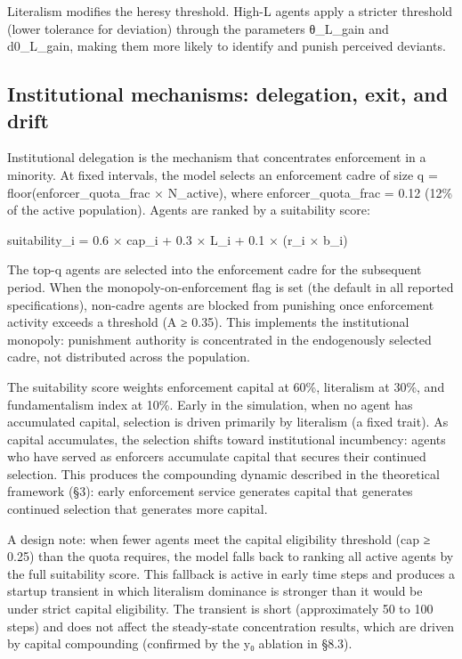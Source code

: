 \documentclass[12pt]{article}
\begin{document}
Literalism modifies the heresy threshold. High-L agents apply a stricter threshold (lower tolerance for deviation) through the parameters θ\_L\_gain and d0\_L\_gain, making them more likely to identify and punish perceived deviants.

%
\subsection{Institutional mechanisms: delegation, exit, and drift}

Institutional delegation is the mechanism that concentrates enforcement in a minority. At fixed intervals, the model selects an enforcement cadre of size q = floor(enforcer\_quota\_frac × N\_active), where enforcer\_quota\_frac = 0.12 (12\% of the active population). Agents are ranked by a suitability score:

suitability\_i = 0.6 × cap\_i + 0.3 × L\_i + 0.1 × (r\_i × b\_i)

The top-q agents are selected into the enforcement cadre for the subsequent period. When the monopoly-on-enforcement flag is set (the default in all reported specifications), non-cadre agents are blocked from punishing once enforcement activity exceeds a threshold (A ≥ 0.35). This implements the institutional monopoly: punishment authority is concentrated in the endogenously selected cadre, not distributed across the population.

The suitability score weights enforcement capital at 60\%, literalism at 30\%, and fundamentalism index at 10\%. Early in the simulation, when no agent has accumulated capital, selection is driven primarily by literalism (a fixed trait). As capital accumulates, the selection shifts toward institutional incumbency: agents who have served as enforcers accumulate capital that secures their continued selection. This produces the compounding dynamic described in the theoretical framework (§3): early enforcement service generates capital that generates continued selection that generates more capital.

A design note: when fewer agents meet the capital eligibility threshold (cap ≥ 0.25) than the quota requires, the model falls back to ranking all active agents by the full suitability score. This fallback is active in early time steps and produces a startup transient in which literalism dominance is stronger than it would be under strict capital eligibility. The transient is short (approximately 50 to 100 steps) and does not affect the steady-state concentration results, which are driven by capital compounding (confirmed by the y₀ ablation in §8.3).
\end{document}
